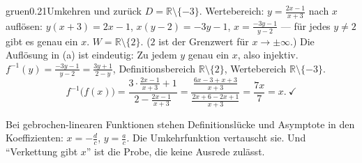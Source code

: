 \begin{loesungkarte}{gruen}{0.21}{Umkehren und zurück}
$D = \mathbb R\setminus\{-3\}$. Wertebereich: $y = \frac{2x - 1}{x + 3}$ nach $x$ auflösen: $y(x + 3) = 2x - 1$, $x(y - 2) = -3y - 1$, $x = \frac{-3y - 1}{y - 2}$ --- für jedes $y\neq2$ gibt es genau ein $x$. $W = \mathbb R\setminus\{2\}$. ($2$ ist der Grenzwert für $x\to\pm\infty$.)
Die Auflösung in (a) ist eindeutig: Zu jedem $y$ genau ein $x$, also injektiv. $f^{-1}(y) = \frac{-3y - 1}{y - 2} = \frac{3y + 1}{2 - y}$, Definitionsbereich $\mathbb R\setminus\{2\}$, Wertebereich $\mathbb R\setminus\{-3\}$.
\[ f^{-1}\bigl(f(x)\bigr) = \frac{3\cdot\frac{2x - 1}{x + 3} + 1}{2 - \frac{2x - 1}{x + 3}} = \frac{\frac{6x - 3 + x + 3}{x + 3}}{\frac{2x + 6 - 2x + 1}{x + 3}} = \frac{7x}{7} = x .\ \checkmark \]
\begin{mitnehmen}\kastentext
Bei gebrochen-linearen Funktionen stehen Definitionslücke und Asymptote in den Koeffizienten: $x = -\frac dc$, $y = \frac ac$. Die Umkehrfunktion vertauscht sie. Und \enquote{Verkettung gibt $x$} ist die Probe, die keine Ausrede zulässt.
\end{mitnehmen}
\end{loesungkarte}

